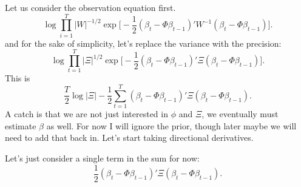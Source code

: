 \documentclass{article}
\begin{document}
Let us consider the observation equation first.
\[
\log \prod_{i=1}^T |W|^{-1/2} \exp \Big[ - \frac{1}{2} (\beta_t - \Phi
\beta_{t-1})' W^{-1} (\beta_t - \Phi \beta_{t-1}) \Big].
\]
and for the sake of simplicity, let's replace the variance with the precision:
\[
\log \prod_{t=1}^T |\Xi|^{1/2} \exp \Big[ - \frac{1}{2} (\beta_t - \Phi
\beta_{t-1})' \Xi (\beta_t - \Phi \beta_{t-1}) \Big].
\]
This is
\[
\frac{T}{2} \log |\Xi| - \frac{1}{2} \sum_{t=1}^T (\beta_t - \Phi
\beta_{t-1})' \Xi (\beta_t - \Phi \beta_{t-1}).
\]
A catch is that we are not just interested in $\phi$ and $\Xi$, we eventually
must estimate $\beta$ as well.  For now I will ignore the prior, though later
maybe we will need to add that back in.  Let's start taking directional
derivatives.  

Let's just consider a single term in the sum for now:
\[
\frac{1}{2} (\beta_t - \Phi \beta_{t-1})' \Xi (\beta_t - \Phi \beta_{t-1}).
\]
\end{document}
